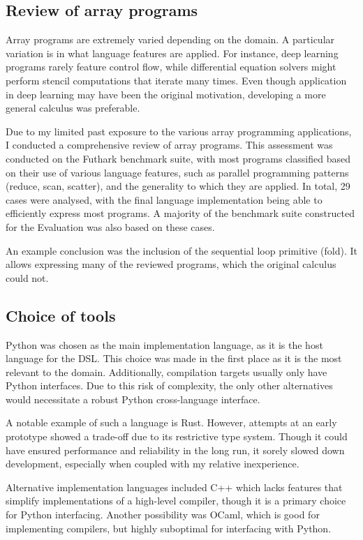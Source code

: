 \subsection{Review of array programs}

Array programs are extremely varied depending on the domain. A particular variation is in what language features are applied. For instance, deep learning programs rarely feature control flow, while differential equation solvers might perform stencil computations that iterate many times. Even though application in deep learning may have been the original motivation, developing a more general calculus was preferable.

Due to my limited past exposure to the various array programming applications, I conducted a comprehensive review of array programs. This assessment was conducted on the Futhark benchmark suite, with most programs classified based on their use of various language features, such as parallel programming patterns (reduce, scan, scatter), and the generality to which they are applied. In total, 29 cases were analysed, with the final language implementation being able to efficiently express most programs. A majority of the benchmark suite constructed for the Evaluation was also based on these cases.

An example conclusion was the inclusion of the sequential loop primitive (fold). It allows expressing many of the reviewed programs, which the original calculus could not. 

\subsection{Choice of tools}

Python was chosen as the main implementation language, as it is the host language for the DSL. This choice was made in the first place as it is the most relevant to the domain. Additionally, compilation targets usually only have Python interfaces. Due to this risk of complexity, the only other alternatives would necessitate a robust Python cross-language interface. 

A notable example of such a language is Rust. However, attempts at an early prototype showed a trade-off due to its restrictive type system. Though it could have ensured performance and reliability in the long run, it sorely slowed down development, especially when coupled with my relative inexperience.

Alternative implementation languages included C++ which lacks features that simplify implementations of a high-level compiler, though it is a primary choice for Python interfacing. Another possibility was OCaml, which is good for implementing compilers, but highly suboptimal for interfacing with Python.

